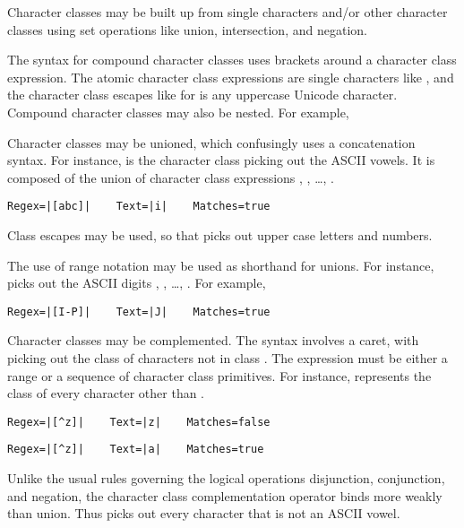 Character classes may be built up from single characters and/or other
character classes using set operations like union, intersection, and
negation.

The syntax for compound character classes uses brackets around a
character class expression.  The atomic character class expressions
are single characters like , and the character class escapes
like  for is any uppercase Unicode character.
Compound character classes may also be nested.  For example,


Character classes may be unioned, which confusingly uses a
concatenation syntax.  For instance, \code{[aeiou]} is the character
class picking out the ASCII vowels.  It is composed of the union of
character class expressions , , \ldots, .  
%
\begin{verbatim}
Regex=|[abc]|    Text=|i|    Matches=true
\end{verbatim}
%
Class escapes may be used, so that \code{[{\bk}p\{Lu\}{\bk}p\{N\}]}
picks out upper case letters and numbers.

The use of range notation may be used as shorthand for unions.
For instance, \code{[0-9]} picks out the ASCII digits ,
, \ldots, .  For example,
%
\begin{verbatim}
Regex=|[I-P]|    Text=|J|    Matches=true
\end{verbatim}

Character classes may be complemented.  The syntax involves a caret,
with \code{[\^{}\codeVar{A}]} picking out the class of characters not
in class .  The expression  must be either a
range or a sequence of character class primitives.  For instance,
\code{[\^{}z]} represents the class of every character other than
.  
%
\begin{verbatim}
Regex=|[^z]|    Text=|z|    Matches=false
\end{verbatim}
%
\begin{verbatim}
Regex=|[^z]|    Text=|a|    Matches=true
\end{verbatim}
%
Unlike the usual rules governing the logical operations disjunction,
conjunction, and negation, the character class complementation
operator binds more weakly than union.  Thus \code{[\^{}aeiou]} picks
out every character that is not an ASCII vowel.

